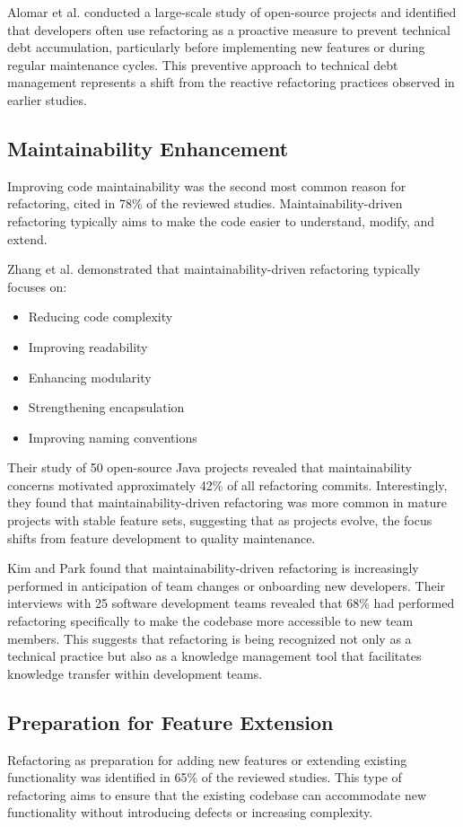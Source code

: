 \documentclass[journal,onecolumn]{IEEEtran}
\begin{document}
Alomar et al. \cite{alomar2022} conducted a large-scale study of open-source projects and identified that developers often use refactoring as a proactive measure to prevent technical debt accumulation, particularly before implementing new features or during regular maintenance cycles. This preventive approach to technical debt management represents a shift from the reactive refactoring practices observed in earlier studies.

\subsection{Maintainability Enhancement}
Improving code maintainability was the second most common reason for refactoring, cited in 78\% of the reviewed studies. Maintainability-driven refactoring typically aims to make the code easier to understand, modify, and extend.

Zhang et al. \cite{zhang2024} demonstrated that maintainability-driven refactoring typically focuses on:
\begin{itemize}
    \item Reducing code complexity
    \item Improving readability
    \item Enhancing modularity
    \item Strengthening encapsulation
    \item Improving naming conventions
\end{itemize}

Their study of 50 open-source Java projects revealed that maintainability concerns motivated approximately 42\% of all refactoring commits. Interestingly, they found that maintainability-driven refactoring was more common in mature projects with stable feature sets, suggesting that as projects evolve, the focus shifts from feature development to quality maintenance.

Kim and Park \cite{kim2023} found that maintainability-driven refactoring is increasingly performed in anticipation of team changes or onboarding new developers. Their interviews with 25 software development teams revealed that 68\% had performed refactoring specifically to make the codebase more accessible to new team members. This suggests that refactoring is being recognized not only as a technical practice but also as a knowledge management tool that facilitates knowledge transfer within development teams.

\subsection{Preparation for Feature Extension}
Refactoring as preparation for adding new features or extending existing functionality was identified in 65\% of the reviewed studies. This type of refactoring aims to ensure that the existing codebase can accommodate new functionality without introducing defects or increasing complexity.
\end{document}
